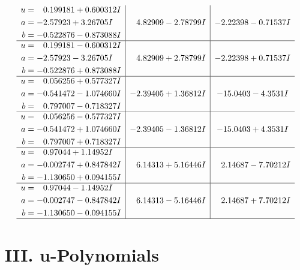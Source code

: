 \documentclass[1p]{elsarticle_modified}
\theoremstyle{definition}
\begin{document}
$$\begin{array}{c|c|c}
\begin{aligned}
u &= \phantom{-}0.199181 + 0.600312 I \\
a &= -2.57923 + 3.26705 I \\
b &= -0.522876 - 0.873088 I\end{aligned}
 & \phantom{-}4.82909 - 2.78799 I & -2.22398 - 0.71537 I \\ \hline\begin{aligned}
u &= \phantom{-}0.199181 - 0.600312 I \\
a &= -2.57923 - 3.26705 I \\
b &= -0.522876 + 0.873088 I\end{aligned}
 & \phantom{-}4.82909 + 2.78799 I & -2.22398 + 0.71537 I \\ \hline\begin{aligned}
u &= \phantom{-}0.056256 + 0.577327 I \\
a &= -0.541472 - 1.074660 I \\
b &= \phantom{-}0.797007 - 0.718327 I\end{aligned}
 & -2.39405 + 1.36812 I & -15.0403 - 4.3531 I \\ \hline\begin{aligned}
u &= \phantom{-}0.056256 - 0.577327 I \\
a &= -0.541472 + 1.074660 I \\
b &= \phantom{-}0.797007 + 0.718327 I\end{aligned}
 & -2.39405 - 1.36812 I & -15.0403 + 4.3531 I \\ \hline\begin{aligned}
u &= \phantom{-}0.97044 + 1.14952 I \\
a &= -0.002747 + 0.847842 I \\
b &= -1.130650 + 0.094155 I\end{aligned}
 & \phantom{-}6.14313 + 5.16446 I & \phantom{-}2.14687 - 7.70212 I \\ \hline\begin{aligned}
u &= \phantom{-}0.97044 - 1.14952 I \\
a &= -0.002747 - 0.847842 I \\
b &= -1.130650 - 0.094155 I\end{aligned}
 & \phantom{-}6.14313 - 5.16446 I & \phantom{-}2.14687 + 7.70212 I\\
 \hline 
 \end{array}$$\newpage
\newpage\renewcommand{\arraystretch}{1}
\centering \section*{ III. u-Polynomials}
\end{document}
